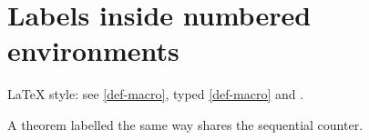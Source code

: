 \section{Labels inside numbered environments}

LaTeX style: see \ref{def-macro}, typed \cref{def-macro} and .


\begin{theorem}
\label{thm-main}
A theorem labelled the same way shares the sequential counter.
\end{theorem}

